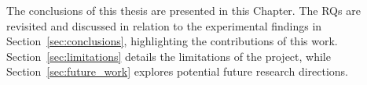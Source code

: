 The conclusions of this thesis are presented in this Chapter.  The \glspl{RQ} are revisited and discussed in relation to the experimental findings in Section~\ref{sec:conclusions}, highlighting the contributions of this work. Section~\ref{sec:limitations} details the limitations of the project, while Section~\ref{sec:future_work} explores potential future research directions.